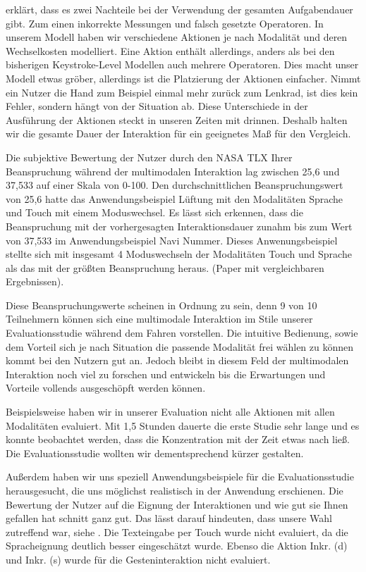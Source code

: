 \citet{Teo:2006} erklärt, dass es zwei Nachteile bei der Verwendung der gesamten Aufgabendauer gibt. 
Zum einen inkorrekte Messungen und falsch gesetzte Operatoren. 
In unserem Modell haben wir verschiedene Aktionen je nach Modalität und deren Wechselkosten modelliert. 
Eine Aktion enthält allerdings, anders als bei den bisherigen Keystroke-Level Modellen auch mehrere Operatoren. 
Dies macht unser Modell etwas gröber, allerdings ist die Platzierung der Aktionen einfacher. 
Nimmt ein Nutzer die Hand zum Beispiel einmal mehr zurück zum Lenkrad, ist dies kein Fehler, sondern hängt von der Situation ab. 
Diese Unterschiede in der Ausführung der Aktionen steckt in unseren Zeiten mit drinnen. 
Deshalb halten wir die gesamte Dauer der Interaktion für ein geeignetes Maß für den Vergleich. 

Die subjektive Bewertung der Nutzer durch den NASA TLX Ihrer Beanspruchung während der multimodalen Interaktion lag zwischen 25,6 und 37,533 auf einer Skala von 0-100. Den durchschnittlichen Beanspruchungswert von 25,6 hatte das Anwendungsbeispiel Lüftung mit den Modalitäten Sprache und Touch mit einem Moduswechsel. Es lässt sich erkennen, dass die Beanspruchung mit der vorhergesagten Interaktionsdauer zunahm bis zum Wert von 37,533 im Anwendungsbeispiel Navi Nummer. Dieses Anwenungsbeispiel stellte sich mit insgesamt 4 Moduswechseln der Modalitäten Touch und Sprache als das mit der größten Beanspruchung heraus. (Paper mit vergleichbaren Ergebnissen). 

Diese Beanspruchungswerte scheinen in Ordnung zu sein, denn 9 von 10 Teilnehmern können sich eine multimodale Interaktion im Stile unserer Evaluationsstudie während dem Fahren vorstellen. Die intuitive Bedienung, sowie dem Vorteil sich je nach Situation die passende Modalität frei wählen zu können kommt bei den Nutzern gut an. Jedoch bleibt in diesem Feld der multimodalen Interaktion noch viel zu forschen und entwickeln bis die Erwartungen und Vorteile vollends ausgeschöpft werden können.

Beispielsweise haben wir in unserer Evaluation nicht alle Aktionen mit allen Modalitäten evaluiert. Mit 1,5 Stunden dauerte die erste Studie sehr lange und es konnte beobachtet werden, dass die Konzentration mit der Zeit etwas nach ließ. Die Evaluationsstudie wollten wir dementsprechend kürzer gestalten. 

Außerdem haben wir uns speziell Anwendungsbeispiele für die Evaluationsstudie herausgesucht, die uns möglichst realistisch in der Anwendung erschienen. Die Bewertung der Nutzer auf die Eignung der Interaktionen und wie gut sie Ihnen gefallen hat schnitt ganz gut. Das lässt darauf hindeuten, dass unsere Wahl zutreffend war, siehe .
Die Texteingabe per Touch wurde nicht evaluiert, da die Spracheignung deutlich besser eingeschätzt wurde. Ebenso die Aktion Inkr. (d) und Inkr. (s) wurde für die Gesteninteraktion nicht evaluiert. 


